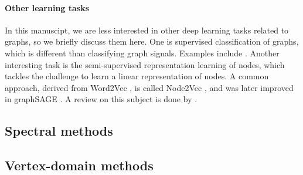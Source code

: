 \paragraph{Other learning tasks}
In this manuscipt, we are less interested in other deep learning tasks related to graphs, so we briefly discuss them here. One is supervised classification of graphs, which is different than classifying graph signals. Examples include \citep{niepert2016learning,tixier2017classifying}. Another interesting task is the semi-supervised representation learning of nodes, which tackles the challenge to learn a linear representation of nodes. A common approach, derived from Word2Vec \citep{mikolov2013efficient,mikolov2013distributed}, is called Node2Vec \citep{grover2016node2vec}, and was later improved in graphSAGE \citep{hamilton2017inductive}. A review on this subject is done by \cite{hamilton2017representation}.

\subsection{Spectral methods}
\label{sec:spec}

\subsection{Vertex-domain methods}
\label{sec:vert}





